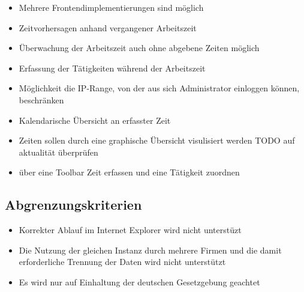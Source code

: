 \begin{itemize}
	\item Mehrere Frontendimplementierungen sind möglich
	\item Zeitvorhersagen anhand vergangener Arbeitszeit
	\item Überwachung der Arbeitszeit auch ohne abgebene Zeiten möglich
	\item Erfassung der Tätigkeiten während der Arbeitszeit
	\item Möglichkeit die IP-Range, von der aus sich Administrator einloggen können, beschränken
	\item Kalendarische Übersicht an erfasster Zeit
	\item Zeiten sollen durch eine graphische Übersicht visulisiert werden TODO auf aktualität überprüfen
	\item über eine Toolbar Zeit erfassen und eine Tätigkeit zuordnen
\end{itemize}


\subsection{Abgrenzungskriterien}
\begin{itemize}
	\item Korrekter Ablauf im Internet Explorer wird nicht unterstüzt
	\item Die Nutzung der gleichen Instanz durch mehrere Firmen und die damit erforderliche Trennung der Daten wird nicht unterstützt
	\item Es wird nur auf Einhaltung der deutschen Gesetzgebung geachtet
\end{itemize}
